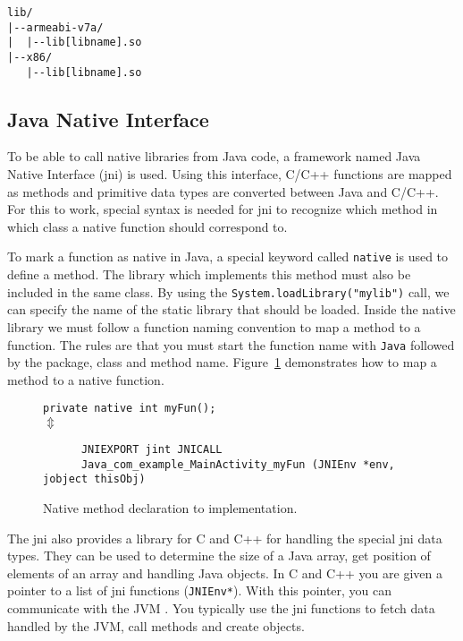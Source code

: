\begin{verbatim}
lib/
|--armeabi-v7a/
|  |--lib[libname].so
|--x86/
   |--lib[libname].so
\end{verbatim}

\subsection{Java Native Interface}
To be able to call native libraries from Java code, a framework named Java Native Interface (\gls{jni}) is used. Using this interface, C/C++ functions are mapped as methods and primitive data types are converted between Java and C/C++. For this to work, special syntax is needed for \gls{jni} to recognize which method in which class a native function should correspond to.

To mark a function as native in Java, a special keyword called \texttt{native} is used to define a method. The library which implements this method must also be included in the same class. By using the \texttt{System.loadLibrary("mylib")} call, we can specify the name of the static library that should be loaded. Inside the native library we must follow a function naming convention to map a method to a function. The rules are that you must start the function name with \texttt{Java} followed by the package, class and method name. Figure~\ref{fig:native} demonstrates how to map a method to a native function.

\ifrelease
\begin{figure}[H]
\begin{center}
    \texttt{private native int myFun();}\\
    $\Updownarrow$
    \begin{verbatim}
      JNIEXPORT jint JNICALL
      Java_com_example_MainActivity_myFun (JNIEnv *env, jobject thisObj)
    \end{verbatim}
\end{center}
\caption{Native method declaration to implementation.}
\label{fig:native}
\end{figure}
\fi

The \gls{jni} also provides a library for C and C++ for handling the special \gls{jni} data types. They can be used to determine the size of a Java array, get position of elements of an array and handling Java objects. In C and C++ you are given a pointer to a list of \gls{jni} functions (\texttt{JNIEnv*}). With this pointer, you can communicate with the JVM \cite[p.~22]{liang1999java}. You typically use the \gls{jni} functions to fetch data handled by the JVM, call methods and create objects.

